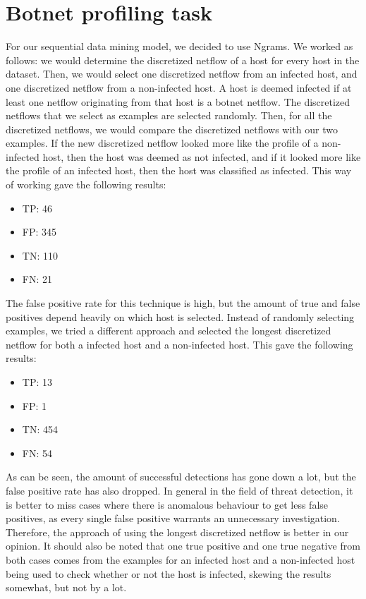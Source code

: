 \documentclass[]{article}
\begin{document}
\section{Botnet profiling task}
For our sequential data mining model, we decided to use Ngrams. We worked as follows: we would determine the discretized netflow of a host for every host in the dataset. Then, we would select one discretized netflow from an infected host, and one discretized netflow from a non-infected host. A host is deemed infected if at least one netflow originating from that host is a botnet netflow. The discretized netflows that we select as examples are selected randomly. Then, for all the discretized netflows, we would compare the discretized netflows with our two examples. If the new discretized netflow looked more like the profile of a non-infected host, then the host was deemed as not infected, and if it looked more like the profile of an infected host, then the host was classified as infected. This way of working gave the following results:
\begin{itemize}
	\item TP: 46
    \item FP: 345
    \item TN: 110
    \item FN: 21
\end{itemize}
The false positive rate for this technique is high, but the amount of true and false positives depend heavily on which host is selected. Instead of randomly selecting examples, we tried a different approach and selected the longest discretized netflow for both a infected host and a non-infected host. This gave the following results:
\begin{itemize}
	\item TP: 13
    \item FP: 1
    \item TN: 454
    \item FN: 54
\end{itemize}
As can be seen, the amount of successful detections has gone down a lot, but the false positive rate has also dropped. In general in the field of threat detection, it is better to miss cases where there is anomalous behaviour to get less false positives, as every single false positive warrants an unnecessary investigation. Therefore, the approach of using the longest discretized netflow is better in our opinion. It should also be noted that one true positive and one true negative from both cases comes from the examples for an infected host and a non-infected host being used to check whether or not the host is infected, skewing the results somewhat, but not by a lot.
\end{document}
